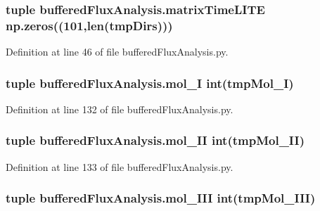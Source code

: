 \hypertarget{namespacebuffered_flux_analysis_a620ce4d1c541ead7668e3872c011a35c}{
\subsubsection[{matrix\-Time\-L\-I\-T\-E}]{\setlength{\rightskip}{0pt plus 5cm}tuple buffered\-Flux\-Analysis.\-matrix\-Time\-L\-I\-T\-E np.\-zeros((101,len({\bf tmp\-Dirs})))}}\label{namespacebuffered_flux_analysis_a620ce4d1c541ead7668e3872c011a35c}


Definition at line 46 of file buffered\-Flux\-Analysis.\-py.

\hypertarget{namespacebuffered_flux_analysis_a64e0bf7f508f99df9f78726bb69f39fc}{
\subsubsection[{mol\-\_\-\-I}]{\setlength{\rightskip}{0pt plus 5cm}tuple buffered\-Flux\-Analysis.\-mol\-\_\-\-I int(tmp\-Mol\-\_\-\-I)}}\label{namespacebuffered_flux_analysis_a64e0bf7f508f99df9f78726bb69f39fc}


Definition at line 132 of file buffered\-Flux\-Analysis.\-py.

\hypertarget{namespacebuffered_flux_analysis_a608780773cb877189c0d288e25bbc3f3}{
\subsubsection[{mol\-\_\-\-I\-I}]{\setlength{\rightskip}{0pt plus 5cm}tuple buffered\-Flux\-Analysis.\-mol\-\_\-\-I\-I int(tmp\-Mol\-\_\-\-I\-I)}}\label{namespacebuffered_flux_analysis_a608780773cb877189c0d288e25bbc3f3}


Definition at line 133 of file buffered\-Flux\-Analysis.\-py.

\hypertarget{namespacebuffered_flux_analysis_adb2a3012a89917afb7db45899a9b3e77}{
\subsubsection[{mol\-\_\-\-I\-I\-I}]{\setlength{\rightskip}{0pt plus 5cm}tuple buffered\-Flux\-Analysis.\-mol\-\_\-\-I\-I\-I int(tmp\-Mol\-\_\-\-I\-I\-I)}}\label{namespacebuffered_flux_analysis_adb2a3012a89917afb7db45899a9b3e77}


